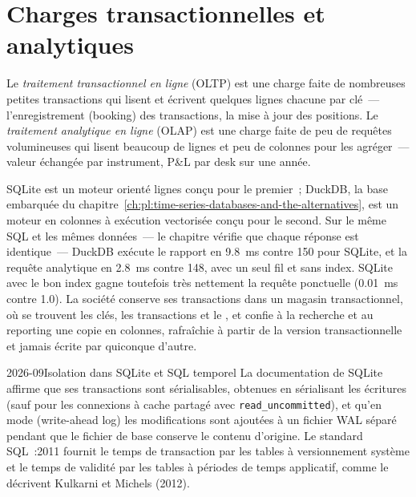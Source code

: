 \section{Charges transactionnelles et analytiques}

\begin{definition}\label{def:pl:databases-and-sql:oltp}
Le \emph{traitement transactionnel en ligne} (OLTP) est une charge faite de nombreuses petites transactions qui lisent et écrivent
quelques lignes chacune par clé~--- l'enregistrement (booking) des transactions, la mise à jour des positions. Le \emph{traitement analytique en ligne} (OLAP)
est une charge faite de peu de requêtes volumineuses qui lisent beaucoup de lignes et peu de colonnes pour les agréger~--- valeur échangée par instrument, P\&L par desk sur une
année.
\end{definition}

SQLite est un moteur orienté lignes conçu pour le premier~; DuckDB, la base embarquée du chapitre~\ref{ch:pl:time-series-databases-and-the-alternatives},
est un moteur en colonnes à exécution vectorisée conçu pour le second. Sur le même SQL et les mêmes données~--- le chapitre vérifie que chaque
réponse est identique~--- DuckDB exécute le rapport en 9.8~ms contre 150 pour SQLite, et la requête analytique en 2.8~ms contre 148, avec un seul fil et sans
index. SQLite avec le bon index gagne toutefois très nettement la requête ponctuelle (0.01~ms contre 1.0). La société conserve ses transactions dans un
magasin transactionnel, où se trouvent les clés, les transactions et le , et confie à la recherche et au reporting une copie en colonnes, rafraîchie
à partir de la version transactionnelle et jamais écrite par quiconque d'autre.

\begin{dated}{2026-09}{Isolation dans SQLite et SQL temporel}\label{dat:pl:databases-and-sql:temporal}
La documentation de SQLite affirme que ses transactions sont sérialisables, obtenues en sérialisant les écritures (sauf pour les connexions à cache partagé
avec \texttt{read\_uncommitted}), et qu'en mode  (write-ahead log) les modifications sont ajoutées à un fichier WAL séparé pendant que le fichier de base conserve
le contenu d'origine. Le standard SQL~:2011 fournit le temps de transaction par les tables à versionnement système et le temps de validité par les tables à
périodes de temps applicatif, comme le décrivent Kulkarni et Michels (2012).
\end{dated}

